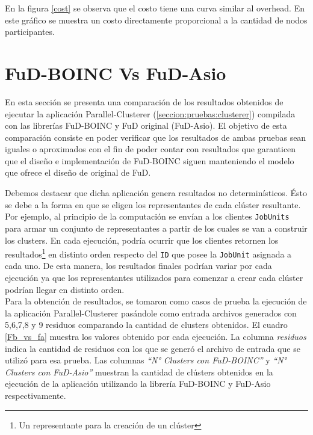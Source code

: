 En la figura \ref{cost} se observa que el costo tiene una curva similar al overhead. En este gráfico se muestra un costo directamente proporcional a la cantidad de nodos participantes.

\section{FuD-BOINC Vs FuD-Asio}

En esta sección se presenta una comparación de los resultados obtenidos de ejecutar la aplicación Parallel-Clusterer (\ref{seccion:pruebas:clusterer}) compilada con las librerías FuD-BOINC y FuD original (FuD-Asio). El objetivo de esta comparación consiste en poder verificar que los resultados de ambas pruebas sean iguales o aproximados con el fin de poder contar con resultados que garanticen que el diseño e implementación de FuD-BOINC siguen manteniendo el modelo que ofrece el diseño de original de FuD.

Debemos destacar que dicha aplicación genera resultados no determinísticos. Ésto se debe a la forma en que se eligen los representantes de cada clúster resultante. Por ejemplo, al principio de la computación se envían a los clientes \texttt{JobUnits} para armar un conjunto de representantes a partir de los cuales se van a construir los clusters. En cada ejecución, podría ocurrir que los clientes retornen los resultados\footnote{Un representante para la creación de un clúster} en distinto orden respecto del \texttt{ID} que posee la \texttt{JobUnit} asignada a cada uno. De esta manera, los resultados finales  podrían variar por cada ejecución ya que los representantes utilizados para comenzar a crear cada clúster podrían llegar en distinto orden. \\

Para la obtención de resultados, se tomaron como casos de prueba la ejecución de la aplicación Parallel-Clusterer pasándole como entrada archivos generados con 5,6,7,8 y 9 residuos comparando la cantidad de clusters obtenidos. El cuadro \ref{Fb_vs_fa} muestra los valores obtenido por cada ejecución. La columna \textit{residuos} indica la cantidad de residuos con los que se generó el archivo de entrada que se utilizó para esa prueba. Las columnas \textit{``N° Clusters con FuD-BOINC''} y \textit{``N° Clusters con FuD-Asio''} muestran la cantidad de clústers obtenidos en la ejecución de la aplicación utilizando la librería FuD-BOINC y FuD-Asio respectivamente.\\


